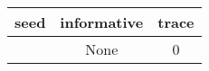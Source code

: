 \begin{tabular}{|c|c|c|}
\hline
seed & informative & trace\\
\hline
\hline
[8] & None & 0\\
\hline
\end{tabular}